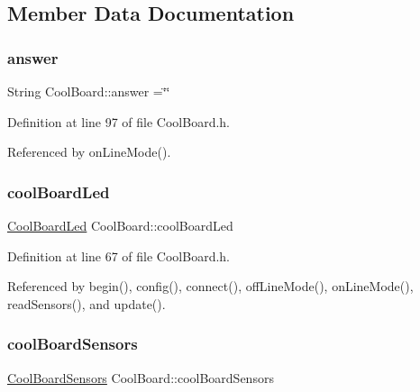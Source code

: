 \subsection{Member Data Documentation}
\mbox{\label{classCoolBoard_a7b835fafd449e5282f7f91d787a2dc15}} 
\subsubsection{\texorpdfstring{answer}{answer}}
{\footnotesize\ttfamily String Cool\+Board\+::answer =\char`\"{}\char`\"{}\hspace{0.3cm}{\ttfamily [private]}}



Definition at line 97 of file Cool\+Board.\+h.



Referenced by on\+Line\+Mode().

\mbox{\label{classCoolBoard_a1b1d3c684a5baa56b08486e192fd8e97}} 
\subsubsection{\texorpdfstring{cool\+Board\+Led}{coolBoardLed}}
{\footnotesize\ttfamily \hyperlink{classCoolBoardLed}{Cool\+Board\+Led} Cool\+Board\+::cool\+Board\+Led\hspace{0.3cm}{\ttfamily [private]}}



Definition at line 67 of file Cool\+Board.\+h.



Referenced by begin(), config(), connect(), off\+Line\+Mode(), on\+Line\+Mode(), read\+Sensors(), and update().

\mbox{\label{classCoolBoard_af102be5288bd7f7a8e59b13f86e26a00}} 
\subsubsection{\texorpdfstring{cool\+Board\+Sensors}{coolBoardSensors}}
{\footnotesize\ttfamily \hyperlink{classCoolBoardSensors}{Cool\+Board\+Sensors} Cool\+Board\+::cool\+Board\+Sensors\hspace{0.3cm}{\ttfamily [private]}}




